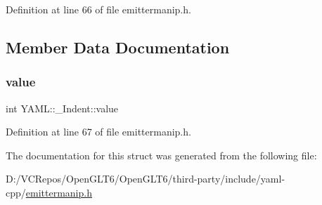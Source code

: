 Definition at line 66 of file emittermanip.\+h.



\subsection{Member Data Documentation}
\mbox{\label{struct_y_a_m_l_1_1___indent_a3ea7eaff092b40d67e5488e03d97c56f}} 
\subsubsection{\texorpdfstring{value}{value}}
{\footnotesize\ttfamily int Y\+A\+M\+L\+::\+\_\+\+Indent\+::value}



Definition at line 67 of file emittermanip.\+h.



The documentation for this struct was generated from the following file\+:\begin{DoxyCompactItemize}
\item 
D\+:/\+V\+C\+Repos/\+Open\+G\+L\+T6/\+Open\+G\+L\+T6/third-\/party/include/yaml-\/cpp/\mbox{\hyperlink{emittermanip_8h}{emittermanip.\+h}}\end{DoxyCompactItemize}
